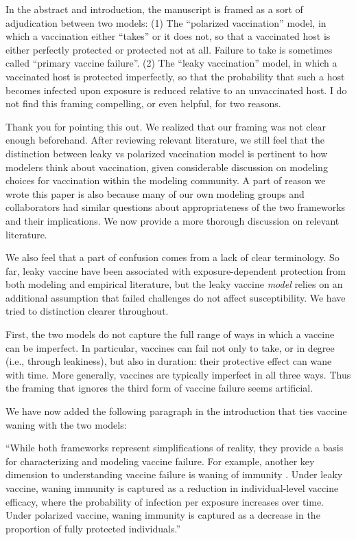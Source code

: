 \documentclass[12pt]{article}
\newcommand{\revtext}{\textsf}
\begin{document}
\revtext{In the abstract and introduction, the manuscript is framed as a sort of adjudication between two models: (1) The “polarized vaccination” model, in which a vaccination either “takes” or it does not, so that a vaccinated host is either perfectly protected or protected not at all. Failure to take is sometimes called “primary vaccine failure”. (2) The “leaky vaccination” model, in which a vaccinated host is protected imperfectly, so that the probability that such a host becomes infected upon exposure is reduced relative to an unvaccinated host. I do not find this framing compelling, or even helpful, for two reasons.} 

Thank you for pointing this out.
We realized that our framing was not clear enough beforehand.
After reviewing relevant literature, we still feel that the distinction between leaky vs polarized vaccination model is pertinent to how modelers think about vaccination, given considerable discussion on modeling choices for vaccination within the modeling community.
A part of reason we wrote this paper is also because many of our own modeling groups and collaborators had similar questions about appropriateness of the two frameworks and their implications.
We now provide a more thorough discussion on relevant literature.

We also feel that a part of confusion comes from a lack of clear terminology.
So far, leaky vaccine have been associated with exposure-dependent protection from both modeling and empirical literature, but the leaky vaccine \emph{model} relies on an additional assumption that failed challenges do not affect susceptibility.
We have tried to distinction clearer throughout.

\revtext{First, the two models do not capture the full range of ways in which a vaccine can be imperfect. In particular, vaccines can fail not only to take, or in degree (i.e., through leakiness), but also in duration: their protective effect can wane with time. More generally, vaccines are typically imperfect in all three ways. Thus the framing that ignores the third form of vaccine failure seems artificial.}

We have now added the following paragraph in the introduction that ties vaccine waning with the two models:

``While both frameworks represent simplifications of reality, they provide a basis for characterizing and modeling vaccine failure.
For example, another key dimension to understanding vaccine failure is waning of immunity \citep{heffernan2009implications}.
Under leaky vaccine, waning immunity is captured as a reduction in individual-level vaccine efficacy, where the probability of infection per exposure increases over time.
Under polarized vaccine, waning immunity is captured as a decrease in the proportion of fully protected individuals.''
\end{document}
